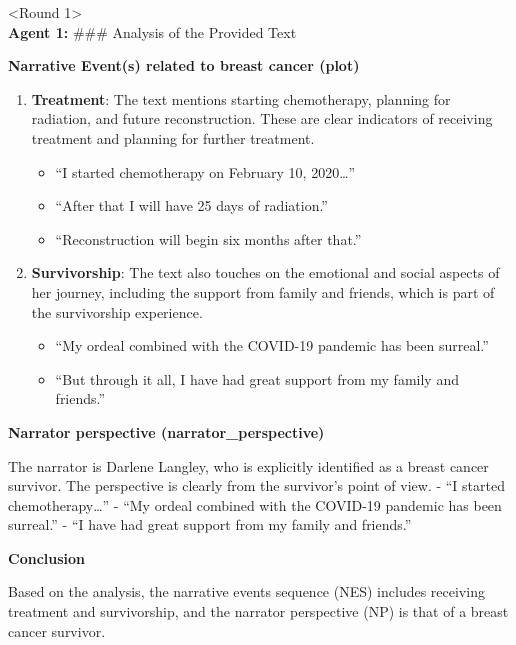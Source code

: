 <Round 1>\\

\textbf{Agent 1:} \#\#\# Analysis of the Provided Text

\textbf{Narrative Event(s) related to breast cancer
(plot)}

\begin{enumerate}
\def\labelenumi{\arabic{enumi}.}
\tightlist
\item
  \textbf{Treatment}: The text mentions starting chemotherapy, planning
  for radiation, and future reconstruction. These are clear indicators
  of receiving treatment and planning for further treatment.

  \begin{itemize}
  \tightlist
  \item
    ``I started chemotherapy on February 10, 2020\ldots{}''
  \item
    ``After that I will have 25 days of radiation.''
  \item
    ``Reconstruction will begin six months after that.''
  \end{itemize}
\item
  \textbf{Survivorship}: The text also touches on the emotional and
  social aspects of her journey, including the support from family and
  friends, which is part of the survivorship experience.

  \begin{itemize}
  \tightlist
  \item
    ``My ordeal combined with the COVID-19 pandemic has been surreal.''
  \item
    ``But through it all, I have had great support from my family and
    friends.''
  \end{itemize}
\end{enumerate}

\textbf{Narrator perspective
(narrator\_perspective)}

The narrator is Darlene Langley, who is explicitly identified as a
breast cancer survivor. The perspective is clearly from the survivor's
point of view. - ``I started chemotherapy\ldots{}'' - ``My ordeal
combined with the COVID-19 pandemic has been surreal.'' - ``I have had
great support from my family and friends.''

\textbf{Conclusion}

Based on the analysis, the narrative events sequence (NES) includes
receiving treatment and survivorship, and the narrator perspective (NP)
is that of a breast cancer survivor.

